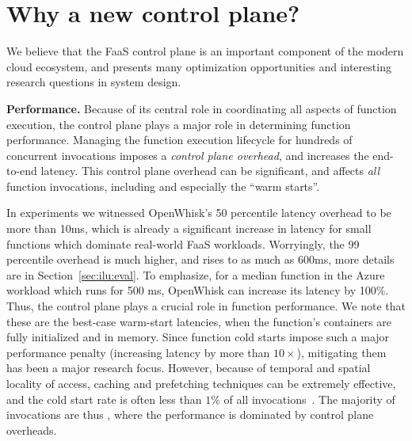 \section{Why a new control plane?}
\label{sec:ilu-motivation}

We believe that the FaaS control plane is an important component of the modern cloud ecosystem, and presents many optimization opportunities and interesting research questions in system design. 

\textbf{Performance.}
%
Because of its central role in coordinating all aspects of function execution, the control plane plays a major role in determining function performance. 
Managing the function execution lifecycle for hundreds of concurrent invocations imposes a \emph{control plane overhead}, and increases the end-to-end latency.
This control plane overhead can be significant, and affects \emph{all} function invocations, including and especially the ``warm starts''. 


In experiments we witnessed OpenWhisk's 50 percentile latency overhead to be more than 10ms,  which is already a significant increase in latency for small functions which dominate real-world FaaS workloads.
Worryingly, the 99 percentile overhead is much higher, and rises to as much as 600ms, more details are in Section~\ref{sec:ilu:eval}.
To emphasize, for a median function in the Azure workload which runs for 500 ms, OpenWhisk can increase its latency by 100\%.  
Thus, the control plane plays a crucial role in function performance.
We note that these are the best-case warm-start latencies, when the function's containers are fully initialized and in memory. 
Since function cold starts impose such a major performance penalty (increasing latency by more than $10\times$), mitigating them has been a major research focus. 
However, because of temporal and spatial locality of access, caching and prefetching techniques can be extremely effective, and the cold start rate is often less than $1\% $ of all invocations~\cite{faascache-asplos21}. 
The majority of invocations are thus , where the performance is dominated by control plane overheads.

